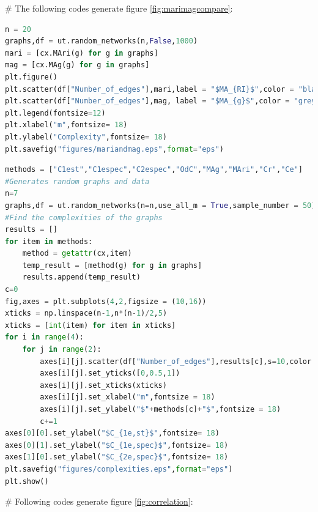 \documentclass[12pt]{article}
\begin{document}
\noindent
\newline
\# The following codes generate figure \ref{fig:marimagcompare}:
\begin{lstlisting}[breaklines=true,language=Python]
n = 20
graphs,df = ut.random_networks(n,False,1000)
mari = [cx.MAri(g) for g in graphs]
mag = [cx.MAg(g) for g in graphs]
plt.figure()
plt.scatter(df["Number_of_edges"],mari,label = "$MA_{RI}$",color = "black",marker = "o",s=10)
plt.scatter(df["Number_of_edges"],mag, label = "$MA_{g}$",color = "grey",marker = "x",s=10)
plt.legend(fontsize=12)
plt.xlabel("m",fontsize= 18)
plt.ylabel("Complexity",fontsize= 18)
plt.savefig("figures/mariandmag.eps",format="eps")
\end{lstlisting}
\begin{lstlisting}[breaklines=true,language=Python]
methods = ["C1est","C1espec","C2espec","OdC","MAg","MAri","Cr","Ce"]
#Generates random graphs and data
n=7
graphs,df = ut.random_networks(n=n,use_all_m = True,sample_number = 50)
#Find the complexities of the graphs
results = []
for item in methods:
    method = getattr(cx,item)
    temp_result = [method(g) for g in graphs]
    results.append(temp_result)
c=0
fig,axes = plt.subplots(4,2,figsize = (10,16))
xticks = np.linspace(n-1,n*(n-1)/2,5)
xticks = [int(item) for item in xticks]
for i in range(4):
    for j in range(2):
        axes[i][j].scatter(df["Number_of_edges"],results[c],s=10,color = "black")
        axes[i][j].set_yticks([0,0.5,1])
        axes[i][j].set_xticks(xticks)
        axes[i][j].set_xlabel("m",fontsize = 18)
        axes[i][j].set_ylabel("$"+methods[c]+"$",fontsize = 18)
        c+=1
axes[0][0].set_ylabel("$C_{1e,st}$",fontsize= 18)
axes[0][1].set_ylabel("$C_{1e,spec}$",fontsize= 18)
axes[1][0].set_ylabel("$C_{2e,spec}$",fontsize= 18)
plt.savefig("figures/complexities.eps",format="eps")
plt.show()
\end{lstlisting}
\noindent
\newline
\# Following codes generate figure \ref{fig:correlation}:
\end{document}
